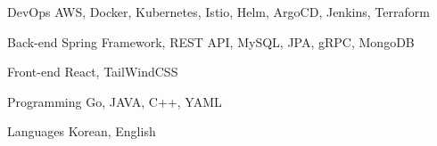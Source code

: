 

\begin{cvskills}

  \cvskill
    {DevOps} %
    {AWS, Docker, Kubernetes, Istio, Helm, ArgoCD, Jenkins, Terraform} %

  \cvskill
    {Back-end} %
    {Spring Framework, REST API, MySQL, JPA, gRPC, MongoDB} %

  \cvskill
    {Front-end} %
    {React, TailWindCSS} %

  \cvskill
    {Programming} %
    {Go, JAVA, C++, YAML} %

  \cvskill
    {Languages} %
    {Korean, English} %

\end{cvskills}
